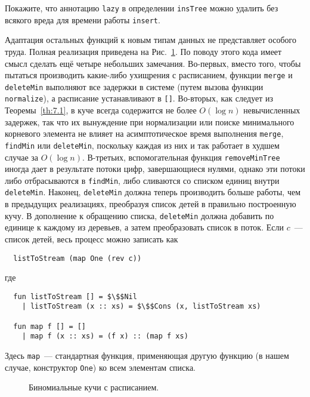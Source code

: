 \begin{exercise}\label{ex:7.3}
  Покажите, что аннотацию \lstinline!lazy! в определении
  \lstinline!insTree! можно удалить без всякого вреда для времени
  работы \lstinline!insert!.
\end{exercise}

Адаптация остальных функций к новым типам данных не представляет
особого труда. Полная реализация приведена на
Рис.~\ref{fig:7.2}. По поводу этого кода имеет смысл сделать ещё
четыре небольших замечания. Во-первых, вместо того, чтобы пытаться
производить какие-либо ухищрения с расписанием, функции
\lstinline!merge! и \lstinline!deleteMin! выполняют все задержки в
системе (путем вызова функции \lstinline!normalize!), а расписание
устанавливают в \lstinline![]!. Во-вторых, как следует из
Теоремы~\ref{th:7.1}, в куче всегда содержится не более $O(\log n)$
невычисленных задержек, так что их вынуждение при нормализации или
поиске минимального корневого элемента не влияет на асимптотическое
время выполнения \lstinline!merge!, \lstinline!findMin! или
\lstinline!deleteMin!, поскольку каждая из них и так работает в худшем
случае за $O(\log n)$. В-третьих, вспомогательная функция
\lstinline!removeMinTree! иногда дает в результате потоки цифр,
завершающиеся нулями, однако эти потоки либо отбрасываются в
\lstinline!findMin!, либо сливаются со списком единиц внутри
\lstinline!deleteMin!. Наконец, \lstinline!deleteMin! должна теперь
производить больше работы, чем в предыдущих реализациях, преобразуя
список детей в правильно построенную кучу. В дополнение к обращению
списка, \lstinline!deleteMin! должна добавить по единице к каждому из
деревьев, а затем преобразовать список в поток. Если $c$~--- список
детей, весь процесс можно записать как
\begin{lstlisting}
  listToStream (map One (rev c))
\end{lstlisting}
где
\begin{lstlisting}
  fun listToStream [] = $\$$Nil
    | listToStream (x :: xs) = $\$$Cons (x, listToStream xs)

  fun map f [] = []
    | map f (x :: xs) = (f x) :: (map f xs)
\end{lstlisting}
Здесь \lstinline!map!~--- стандартная функция, применяющая другую
функцию (в нашем случае, конструктор \lstinline!One!) ко всем
элементам списка.

\begin{figure}
  \centering
  
  \caption{Биномиальные кучи с расписанием.}
  \label{fig:7.2}
\end{figure}

